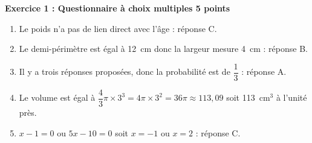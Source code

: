 \textbf{Exercice 1 : Questionnaire à choix multiples \hfill 5 points}

\medskip

%
%
%
\begin{enumerate}
\item Le poids n'a pas de lien direct avec l'âge : réponse C.
\item Le demi-périmètre est égal à 12~cm donc la largeur mesure 4~cm : réponse B.
\item Il y a trois réponses proposées, donc la probabilité est de $\dfrac{1}{3}$ : réponse A.
\item Le volume est égal à $\dfrac{4}{3}\pi \times 3^3 = 4\pi \times 3^2 = 36\pi\approx 113,09$ soit 113~cm$^3$ à l'unité près.
\item $x - 1 = 0$ ou $5x - 10 = 0$ soit $x = - 1$ ou $x = 2$ : réponse C.
\end{enumerate}

\vspace{0,5cm}

